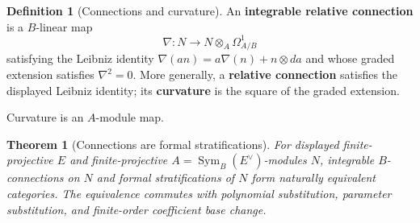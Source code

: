 \documentclass[11pt,a4paper]{article}
\numberwithin{algorithm}{section}
\numberwithin{equation}{section}
\newtheorem{theorem}{Theorem}[section]
\theoremstyle{definition}
\newtheorem{definition}[definition]{Definition}
\theoremstyle{remark}
\theoremstyle{plain}
\newcommand{\Sym}{\operatorname{Sym}}
\theoremstyle{definition}
\theoremstyle{plain}
\begin{document}
\begin{definition}[Connections and curvature]\label{def:connections}
An \textbf{integrable relative connection} is a $B$-linear map
\[
 \nabla:N\to N\otimes_A\Omega^1_{A/B}
\]
satisfying the Leibniz identity
$\nabla(an)=a\nabla(n)+n\otimes da$ and whose graded
extension satisfies $\nabla^2=0$. More generally, a \textbf{relative
connection} satisfies the displayed Leibniz identity; its
\textbf{curvature} is the square of the graded extension.
\end{definition}

  Curvature is an $A$-module map.

\begin{theorem}[Connections are formal stratifications]
\label{thm:connection-stratification}
For displayed finite-projective $E$ and finite-projective
$A=\Sym_B(E^\vee)$-modules $N$, integrable $B$-connections
on $N$ and formal stratifications of $N$ form naturally
equivalent categories.  The equivalence commutes with
polynomial substitution, parameter substitution, and finite-order
coefficient base change.
\end{theorem}
\end{document}
